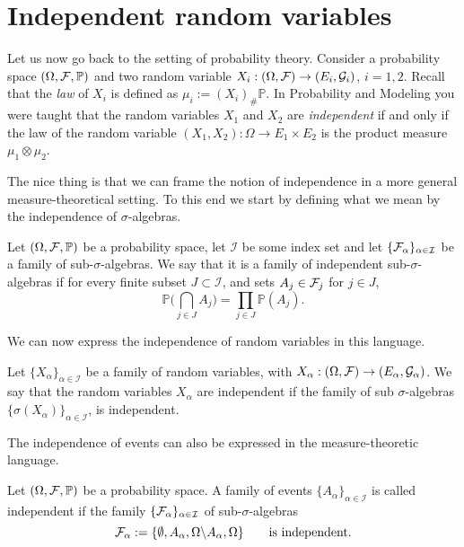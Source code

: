
\section{Independent random variables}

Let us now go back to the setting of probability theory. Consider a probability space $(\Omega, \mathcal F, \mathbb{P})$ and two random variable $X_i: (\Omega, \mathcal F) \to (E_i, \mathcal{G}_i)$, $i=1,2$. Recall that the \emph{law} of $X_i$ is defined as $\mu_i:= (X_i)_\# \mathbb{P}$. In Probability and Modeling you were taught that the random variables $X_1$ and $X_2$ are \emph{independent} if and only if the law of the random variable $(X_1, X_2): \Omega \to E_1\times E_2$ is the product measure $\mu_1 \otimes \mu_2$.

The nice thing is that we can frame the notion of independence in a more general measure-theoretical setting. To this end we start by defining what we mean by the independence of $\sigma$-algebras.

\begin{definition}
	Let $(\Omega, \mathcal F, \mathbb{P})$ be a probability space, let $\mathcal{I}$ be some index set and let $\{\mathcal F_\alpha\}_{\alpha \in \mathcal{I}}$ be a family of sub-$\sigma$-algebras. We say that it is a family of independent sub-$\sigma$-algebras if for every finite subset $J \subset \mathcal{I}$, and sets $A_j\in \mathcal F_j$ for $j \in J$,
	\[
	\mathbb{P}\biggl( \bigcap_{j \in J} A_j \biggr) = \prod_{j \in J} \mathbb{P}(A_{j}).
	\]
\end{definition}

We can now express the independence of random variables in this language.

\begin{definition}\label{def:independent_rvs}
	Let $\{X_\alpha\}_{\alpha \in \mathcal{I}}$ be a family of random variables, with $X_\alpha:(\Omega, \mathcal F) \to (E_\alpha, \mathcal{G}_\alpha)$. We say that the random variables $X_\alpha$ are independent if the family of sub $\sigma$-algebras $\{\sigma(X_\alpha)\}_{\alpha \in \mathcal{I}}$, is independent.
\end{definition}

The independence of events can also be expressed in the measure-theoretic language.

\begin{definition}
	Let $(\Omega, \mathcal F, \mathbb{P})$ be a probability space. A family of events $\{A_\alpha\}_{\alpha \in \mathcal{I}}$ is called independent if the family $\{ \mathcal F_\alpha \}_{\alpha\in\mathcal{I}}$ of sub-$\sigma$-algebras
	\[
	\mathcal F_\alpha := \{ \emptyset, A_\alpha, \Omega \backslash A_\alpha, \Omega \}\qquad\text{is independent.}
	\]	
\end{definition}

